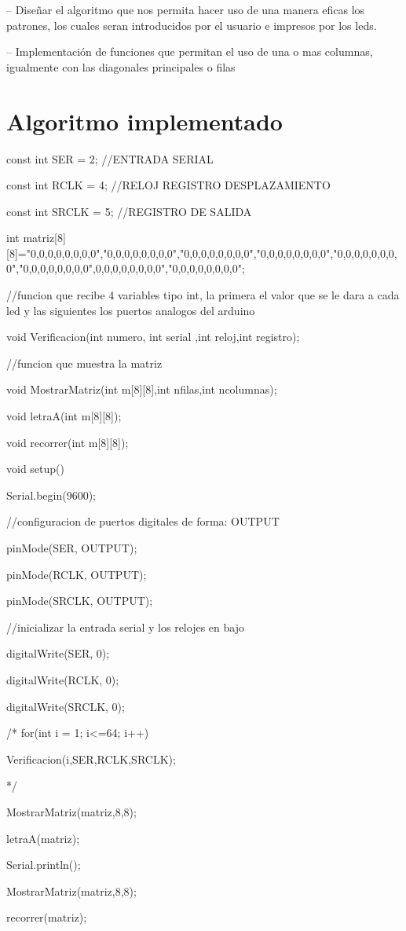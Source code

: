 \documentclass{article}
\begin{document}
-- Diseñar el algoritmo que nos permita hacer uso de una manera eficas los patrones, los cuales seran introducidos por el usuario e impresos por los leds.

-- Implementación de funciones que permitan el uso de una o mas columnas, igualmente con las diagonales principales o filas


\section{Algoritmo implementado} \label{contenido}

const int SER = 2;	//ENTRADA SERIAL

const int RCLK = 4;	//RELOJ REGISTRO DESPLAZAMIENTO

const int SRCLK = 5;  //REGISTRO DE SALIDA

int matriz[8][8]={{"0,0,0,0,0,0,0,0"},{"0,0,0,0,0,0,0,0"},{"0,0,0,0,0,0,0,0"},{"0,0,0,0,0,0,0,0"},{"0,0,0,0,0,0,0,0"},{"0,0,0,0,0,0,0,0"},{0,0,0,0,0,0,0,0"},{"0,0,0,0,0,0,0,0"}};


//funcion que recibe 4 variables tipo int, la primera el valor que se le dara a cada led y las siguientes los puertos analogos del arduino

void Verificacion(int numero, int serial ,int reloj,int registro);

//funcion que muestra la matriz

void MostrarMatriz(int m[8][8],int nfilas,int ncolumnas);

void letraA(int m[8][8]);

void recorrer(int m[8][8]);

void setup()
{
  Serial.begin(9600);
  
  //configuracion de puertos digitales de forma: OUTPUT
  
  pinMode(SER, OUTPUT);
  
  pinMode(RCLK, OUTPUT);
  
  pinMode(SRCLK, OUTPUT);
  
  //inicializar la entrada serial y los relojes en bajo
  
  digitalWrite(SER, 0);
  
  digitalWrite(RCLK, 0);
  
  digitalWrite(SRCLK, 0);
  
  /*
  for(int i = 1; i<=64; i++)
  
  {
  
    Verificacion(i,SER,RCLK,SRCLK);   
    
  } 
  */
  
  MostrarMatriz(matriz,8,8);
  
  letraA(matriz);
  
  Serial.println();
  
  MostrarMatriz(matriz,8,8);
  
  recorrer(matriz);
  
  
}
\end{document}
